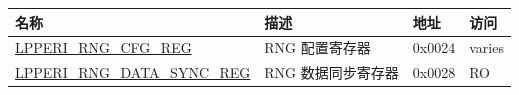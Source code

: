 
\begin{longtable}{ | p{6cm} | p{7.2cm} | p{1.3cm} | p{1cm} | }
\hline\rowcolor{lightgray}
\textbf{名称} & \textbf{描述} &  \textbf{地址} & \textbf{访问} \\ \hline
\endhead
\hyperref[regdesc:LPPERIRNGCFGREG]{LPPERI\_RNG\_CFG\_REG} & RNG 配置寄存器 & 0x0024 & varies \\ \hline
\hyperref[regdesc:LPPERIRNGSYNCDATAREG]{LPPERI\_RNG\_DATA\_SYNC\_REG} & RNG 数据同步寄存器 & 0x0028 & RO \\ \hline
\end{longtable}
